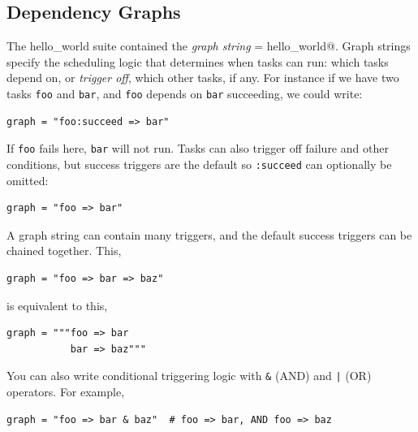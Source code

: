 
\subsection{Dependency Graphs}

The hello\_world suite contained the {\em graph string}
\lstinline@graph = hello_world@.  Graph strings specify the scheduling logic
that determines when tasks can run: which tasks depend on, or {\em trigger off},
which other tasks, if any.  For instance if we have two tasks \lstinline{foo}
and \lstinline{bar}, and \lstinline{foo} depends on \lstinline{bar} succeeding,
we could write:

\begin{lstlisting}[language=suiterc]
graph = "foo:succeed => bar"
\end{lstlisting}

If \lstinline{foo} fails here, \lstinline{bar} will not run.  Tasks can also
trigger off failure and other conditions, but success triggers are the default
so \lstinline=:succeed= can optionally be omitted:

\begin{lstlisting}[language=suiterc]
graph = "foo => bar"
\end{lstlisting}

A graph string can contain many triggers, and the default success triggers can
be chained together. This,

\begin{lstlisting}[language=suiterc]
graph = "foo => bar => baz"
\end{lstlisting}

is equivalent to this,

\begin{lstlisting}[language=suiterc]
graph = """foo => bar
           bar => baz"""
\end{lstlisting}

You can also write conditional triggering logic with \lstinline=&= (AND) and
\lstinline=|= (OR) operators. For example,

\begin{lstlisting}[language=suiterc]
graph = "foo => bar & baz"  # foo => bar, AND foo => baz
\end{lstlisting}

